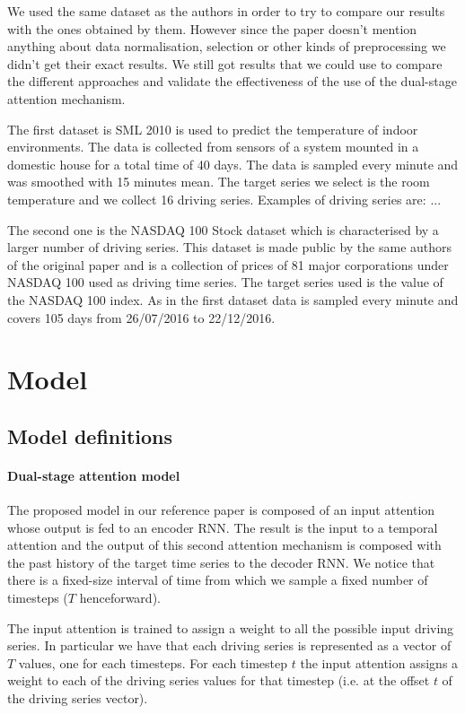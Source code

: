 \documentclass{article}
\begin{document}
We used the same dataset as the authors in order to try to compare our results
with the ones obtained by them. However
since the paper doesn't mention anything about data normalisation, selection or
other kinds of preprocessing we didn't
get their exact results. We still got results that we could use to compare the
different approaches and validate the
effectiveness of the use of the dual-stage attention mechanism.

The first dataset is SML 2010 is used to predict the temperature of indoor 
environments. The data is collected from sensors of a system mounted in a 
domestic house for a total time of 40 days. The data is sampled every minute and 
was smoothed with 15 minutes mean. The target series we select is the room 
temperature and we collect 16 driving series. Examples of driving series are: ...

The second one is the NASDAQ 100 Stock dataset which is characterised by a
larger number of driving series. This dataset is made public by the same authors of the original paper and is a collection of prices of 81 major corporations under NASDAQ 100 used as driving time series. The target series used is the value of the NASDAQ 100 index. As in the first dataset data is sampled every minute and covers 105 days from 26/07/2016 to 22/12/2016.

\section{Model}
\label{sec:model}

\subsection{Model definitions}
\paragraph{Dual-stage attention model}

The proposed model in our reference paper is composed of an input attention
whose output is fed to an encoder RNN. The
result is the input to a temporal attention and the output of this second
attention mechanism is composed with the
past history of the target time series to the decoder RNN. We notice that there
is a fixed-size interval of time from
which we sample a fixed number of timesteps ($T$ henceforward).

The input attention is trained to assign a weight to all the possible input
driving series. In particular we have
that each driving series is represented as a vector of $T$ values, one for each
timesteps. For each timestep $t$ the
input attention assigns a weight to each of the driving series values for that
timestep (i.e. at the offset $t$ of the
driving series vector).
\end{document}
